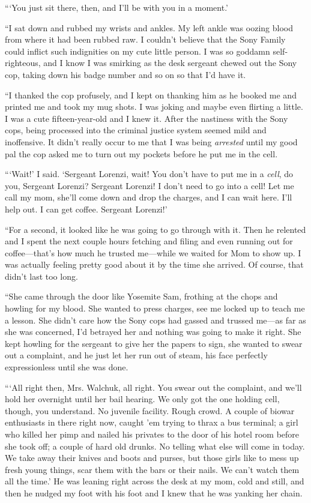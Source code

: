 “‘You just sit there, then, and I’ll be with you in a moment.’

“I sat down and rubbed my wrists and ankles. My left ankle was
oozing blood from where it had been rubbed raw. I couldn’t believe
that the Sony Family could inflict such indignities on my cute
little person. I was so goddamn self-righteous, and I know I was
smirking as the desk sergeant chewed out the Sony cop, taking down
his badge number and so on so that I’d have it.

“I thanked the cop profusely, and I kept on thanking him as he
booked me and printed me and took my mug shots. I was joking and
maybe even flirting a little. I was a cute fifteen-year-old and I
knew it. After the nastiness with the Sony cops, being processed
into the criminal justice system seemed mild and inoffensive. It
didn’t really occur to me that I was being \emph{arrested} until my
good pal the cop asked me to turn out my pockets before he put me
in the cell.

“‘Wait!’ I said. ‘Sergeant Lorenzi, wait! You don’t have to put me
in a \emph{cell}, do you, Sergeant Lorenzi? Sergeant Lorenzi! I
don’t need to go into a cell! Let me call my mom, she’ll come down
and drop the charges, and I can wait here. I’ll help out. I can get
coffee. Sergeant Lorenzi!’

“For a second, it looked like he was going to go through with it.
Then he relented and I spent the next couple hours fetching and
filing and even running out for coffee—that’s how much he trusted
me—while we waited for Mom to show up. I was actually feeling
pretty good about it by the time she arrived. Of course, that
didn’t last too long.

“She came through the door like Yosemite Sam, frothing at the chops
and howling for my blood. She wanted to press charges, see me
locked up to teach me a lesson. She didn’t care how the Sony cops
had gassed and trussed me—as far as she was concerned, I’d betrayed
her and nothing was going to make it right. She kept howling for
the sergeant to give her the papers to sign, she wanted to swear
out a complaint, and he just let her run out of steam, his face
perfectly expressionless until she was done.

“‘All right then, Mrs. Walchuk, all right. You swear out the
complaint, and we’ll hold her overnight until her bail hearing. We
only got the one holding cell, though, you understand. No juvenile
facility. Rough crowd. A couple of biowar enthusiasts in there
right now, caught ’em trying to thrax a bus terminal; a girl who
killed her pimp and nailed his privates to the door of his hotel
room before she took off; a couple of hard old drunks. No telling
what else will come in today. We take away their knives and boots
and purses, but those girls like to mess up fresh young things,
scar them with the bars or their nails. We can’t watch them all the
time.’ He was leaning right across the desk at my mom, cold and
still, and then he nudged my foot with his foot and I knew that he
was yanking her chain.

